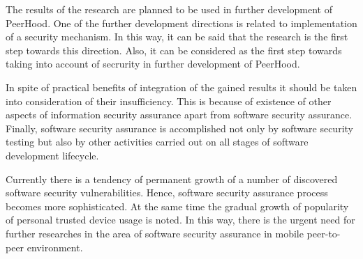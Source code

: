

%
The results of the research are planned to be used in further development of PeerHood. 
%
One of the further development directions is related to implementation of a security mechanism. 
%
In this way, it can be said that the research is the first step towards this direction. 
%
Also, it can be considered as the first step towards taking into account of secrurity in further development of PeerHood. 

%
In spite of practical benefits of integration of the gained results it should be taken into consideration of their insufficiency. 
%
This is because of existence of other aspects of information security assurance apart from software security assurance. 
%
Finally, software security assurance is accomplished not only by software security testing but also by other activities carried out on all stages of software development lifecycle. 

%
Currently there is a tendency of permanent growth of a number of discovered software security vulnerabilities. 
%
Hence, software security assurance process becomes more sophisticated. 
%
At the same time the gradual growth of popularity of personal trusted device usage is noted. 
%
In this way, there is the urgent need for further researches in the area of software security assurance in mobile peer-to-peer environment. 